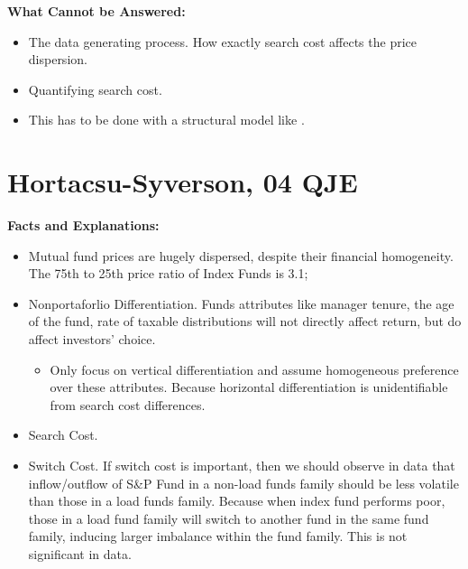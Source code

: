 \documentclass{book}
\theoremstyle{plain}
\theoremstyle{definition}
\begin{document}
\vspace{1em}
\noindent
\textbf{What Cannot be Answered:}
\begin{itemize}
	\item The data generating process. How exactly search cost affects the price dispersion.
	\item Quantifying search cost.
	\item This has to be done with a structural model like \cite{Hortacsu:2004bg}.
\end{itemize}






\section{Hortacsu-Syverson, 04 QJE} %
\label{sec:hortacsu_syverson_04_qje}

\textbf{}

\vspace{1em}
\noindent
\textbf{Facts and Explanations:}
\begin{itemize}
	\item Mutual fund prices are hugely dispersed, despite their financial homogeneity. The 75th to 25th price ratio of Index Funds is 3.1;
	\item Nonportaforlio Differentiation. Funds attributes like manager tenure, the age of the fund, rate of taxable distributions will not directly affect return, but do affect investors' choice.
	\begin{itemize}
		\item Only focus on vertical differentiation and assume homogeneous preference over these attributes. Because horizontal differentiation is unidentifiable from search cost differences.
	\end{itemize}
	\item Search Cost.
	\item Switch Cost. If switch cost is important, then we should observe in data that inflow/outflow of S\&P Fund in a non-load funds family should be less volatile than those in a load funds family. Because when index fund performs poor, those in a load fund family will switch to another fund in the same fund family, inducing larger imbalance within the fund family. This is not significant in data.
\end{itemize}
\end{document}
